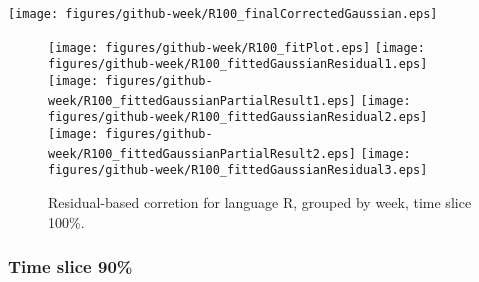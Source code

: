 \begin{center}
{\texttt{[image: figures/github-week/R100\_finalCorrectedGaussian.eps]}}
\end{center}

\FloatBarrier

\begin{figure}[t]
\centering
{}
{\texttt{[image: figures/github-week/R100\_fitPlot.eps]}}
{\texttt{[image: figures/github-week/R100\_fittedGaussianResidual1.eps]}}
{\texttt{[image: figures/github-week/R100\_fittedGaussianPartialResult1.eps]}}
{\texttt{[image: figures/github-week/R100\_fittedGaussianResidual2.eps]}}
{\texttt{[image: figures/github-week/R100\_fittedGaussianPartialResult2.eps]}}
{\texttt{[image: figures/github-week/R100\_fittedGaussianResidual3.eps]}}
\caption{Residual-based corretion for language R, grouped by week, time slice 100\%.}
\end{figure}


\FloatBarrier


\subsubsection{Time slice 90\%}


